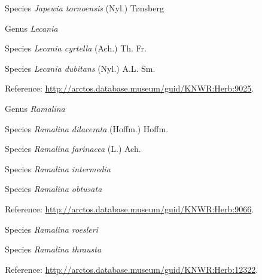 \documentclass[9pt, article]{memoir}
\begin{document}
\begin{multicols}{2}
\vspace{6pt}\noindent\hspace{36pt}Species \textit{Japewia tornoensis} (Nyl.) Tønsberg


\vspace{6pt}\noindent\hspace{30pt}Genus \textit{Lecania}


\vspace{6pt}\noindent\hspace{36pt}Species \textit{Lecania cyrtella} (Ach.) Th. Fr.


\vspace{6pt}\noindent\hspace{36pt}Species \textit{Lecania dubitans} (Nyl.) A.L. Sm.


\vspace{6pt}Reference: 
\url{http://arctos.database.museum/guid/KNWR:Herb:9025}.

\vspace{6pt}\noindent\hspace{30pt}Genus \textit{Ramalina}


\vspace{6pt}\noindent\hspace{36pt}Species \textit{Ramalina dilacerata} (Hoffm.) Hoffm.


\vspace{6pt}\noindent\hspace{36pt}Species \textit{Ramalina farinacea} (L.) Ach.


\vspace{6pt}\noindent\hspace{36pt}Species \textit{Ramalina intermedia}


\vspace{6pt}\noindent\hspace{36pt}Species \textit{Ramalina obtusata}


\vspace{6pt}Reference: 
\url{http://arctos.database.museum/guid/KNWR:Herb:9066}.

\vspace{6pt}\noindent\hspace{36pt}Species \textit{Ramalina roesleri}


\vspace{6pt}\noindent\hspace{36pt}Species \textit{Ramalina thrausta}


\vspace{6pt}Reference: 
\url{http://arctos.database.museum/guid/KNWR:Herb:12322}.


\end{multicols}
\end{document}
